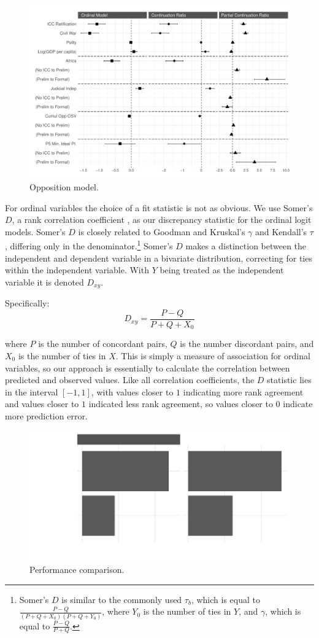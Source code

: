 \begin{figure}
    \centering
    \includegraphics[width=1\textwidth]{modCompare_opp.pdf}
    \caption{Opposition model.}
    \label{fig:oppCoefCompare}
\end{figure}

For ordinal variables the choice of a fit statistic is not as obvious. We use Somer's $D$, a rank correlation coefficient  \citep{Somers1962}, as our discrepancy statistic for the ordinal logit models. Somer's $D$ is closely related to Goodman and Kruskal's $\gamma$ and Kendall's $\tau$, differing only in the denominator.\footnote{Somer's $D$ is similar to the commonly used $\tau_b$, which is equal to $\frac{P - Q}{(P+Q+X_0)(P+Q+Y_0)}$, where $Y_0$ is the number of ties in $Y$, and $\gamma$, which is equal to $\frac{P - Q}{P + Q}$.} Somer's $D$ makes a distinction between the independent and dependent variable in a bivariate distribution, correcting for ties within the independent variable. With $Y$ being treated as the independent variable it is denoted $D_{xy}$.

Specifically:
$$D_{xy} = \frac{P - Q}{P + Q + X_0}$$

\noindent where $P$ is the number of concordant pairs, $Q$ is the number discordant pairs, and $X_0$ is the number of ties in $X$. This is simply a measure of association for ordinal variables, so our approach is essentially to calculate the correlation between predicted and observed values. Like all correlation coefficients, the $D$ statistic lies in the interval $[-1, 1]$, with values closer to $1$ indicating more rank agreement and values closer to $1$ indicated less rank agreement, so values closer to 0 indicate more prediction error.

\begin{figure}
    \centering
    \includegraphics[width=1\textwidth]{somerViz.pdf}
    \caption{Performance comparison.}
    \label{fig:somersD}
\end{figure}
